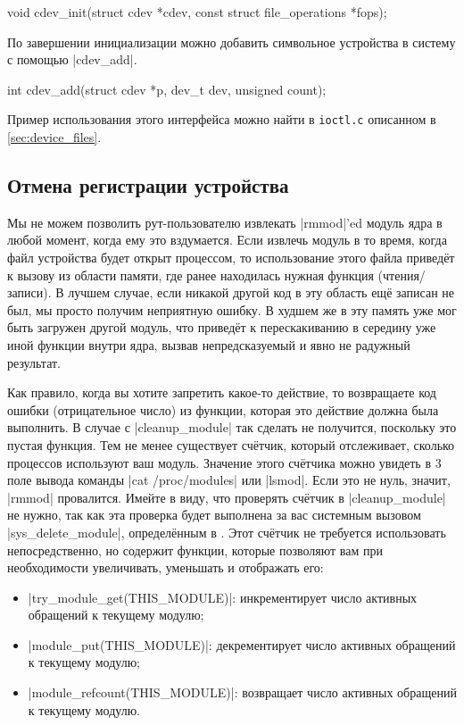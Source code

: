 \documentclass[10pt, oneside]{book}
\begin{document}
\begin{code}
void cdev_init(struct cdev *cdev, const struct file_operations *fops);
\end{code}

По завершении инициализации можно добавить символьное устройства в систему с помощью \cpp|cdev_add|.

\begin{code}
int cdev_add(struct cdev *p, dev_t dev, unsigned count);
\end{code}

Пример использования этого интерфейса можно найти в \verb|ioctl.c| описанном в \ref{sec:device_files}.

\subsection{Отмена регистрации устройства}
\label{sec:unregister_device}
Мы не можем позволить рут-пользователю извлекать \sh|rmmod|'ed модуль ядра в любой момент, когда ему это вздумается. Если извлечь модуль в то время, когда файл устройства будет открыт процессом, то использование этого файла приведёт к вызову из области памяти, где ранее находилась нужная функция (чтения/записи).
В лучшем случае, если никакой другой код в эту область ещё записан не был, мы просто получим неприятную ошибку. В худшем же в эту память уже мог быть загружен другой модуль, что приведёт к перескакиванию в середину уже иной функции внутри ядра, вызвав непредсказуемый и явно не радужный результат.

Как правило, когда вы хотите запретить какое-то действие, то возвращаете код ошибки (отрицательное число) из функции, которая это действие должна была выполнить. В случае с \cpp|cleanup_module| так сделать не получится, поскольку это пустая функция.
Тем не менее существует счётчик, который отслеживает, сколько процессов используют ваш модуль. Значение этого счётчика можно увидеть в 3 поле вывода команды \sh|cat /proc/modules| или \sh|lsmod|.
Если это не нуль, значит, \sh|rmmod| провалится.
Имейте в виду, что проверять счётчик в \cpp|cleanup_module| не нужно, так как эта проверка будет выполнена за вас системным вызовом \cpp|sys_delete_module|, определённым в .
Этот счётчик не требуется использовать непосредственно, но  содержит функции, которые позволяют вам при необходимости увеличивать, уменьшать и отображать его:

\begin{itemize}
  \item \cpp|try_module_get(THIS_MODULE)|: инкрементирует число активных обращений к текущему модулю;
  \item \cpp|module_put(THIS_MODULE)|: декрементирует число активных обращений к текущему модулю;
  \item \cpp|module_refcount(THIS_MODULE)|: возвращает число активных обращений к текущему модулю.
\end{itemize}
\end{document}
